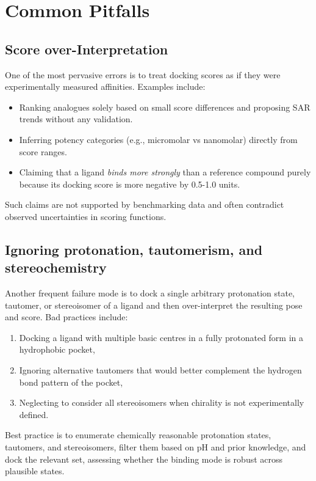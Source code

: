 \documentclass[12pt]{article}
\begin{document}
\section{Common Pitfalls}

\subsection{Score over-Interpretation}

One of the most pervasive errors is to treat docking scores as if they were experimentally measured affinities. Examples include:

\begin{itemize}
  \item Ranking analogues solely based on small score differences and proposing SAR trends without any validation.
  \item Inferring potency categories (e.g., micromolar vs nanomolar) directly from score ranges.
  \item Claiming that a ligand \emph{binds more strongly} than a reference compound purely because its docking score is more negative by 0.5-1.0 units.
\end{itemize}

Such claims are not supported by benchmarking data and often contradict observed uncertainties in scoring functions\cite{CH8_Warren2006,CH8_Cheng2009}.

\subsection{Ignoring protonation, tautomerism, and stereochemistry}

Another frequent failure mode is to dock a single arbitrary protonation state, tautomer, or stereoisomer of a ligand and then over-interpret the resulting pose and score. Bad practices include:

\begin{enumerate}
  \item Docking a ligand with multiple basic centres in a fully protonated form in a hydrophobic pocket,
  \item Ignoring alternative tautomers that would better complement the hydrogen bond pattern of the pocket,
  \item Neglecting to consider all stereoisomers when chirality is not experimentally defined.
\end{enumerate}

Best practice is to enumerate chemically reasonable protonation states, tautomers, and stereoisomers, filter them based on pH and prior knowledge, and dock the relevant set, assessing whether the binding mode is robust across plausible states.
\end{document}
